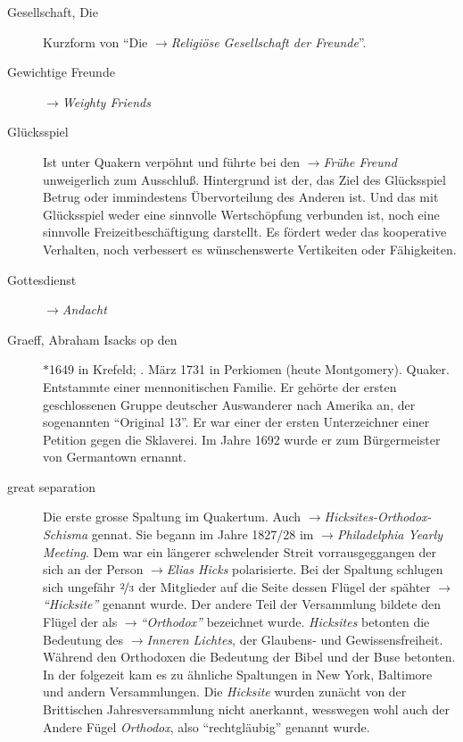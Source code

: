 \begin{description}
 \item[Gesellschaft, Die] Kurzform von "`Die
 $\to$\textit{Religiöse Gesellschaft der Freunde}"'.

\item[Gewichtige Freunde] $\to$\textit{Weighty Friends}

\item[Glücksspiel] Ist unter Quakern verpöhnt und führte bei den
$\to$\textit{Frühe Freund} unweigerlich zum Ausschluß. Hintergrund ist der,
das Ziel des Glücksspiel Betrug oder immindestens Übervorteilung des Anderen
ist. Und das mit Glücksspiel weder eine sinnvolle Wertschöpfung verbunden ist,
noch eine sinnvolle Freizeitbeschäftigung darstellt. Es fördert weder das
kooperative Verhalten, noch verbessert es wünschenswerte Vertikeiten oder
Fähigkeiten.

\item[Gottesdienst] $\to$\textit{Andacht}

 \item[Graeff, Abraham Isacks op den]  $\ast$1649 in Krefeld; . März 1731
 in Perkiomen (heute Montgomery). Quaker. Entstammte einer mennonitischen Familie.
Er gehörte der ersten geschlossenen Gruppe deutscher Auswanderer nach Amerika
an, der sogenannten "`Original 13"'. Er war einer der ersten Unterzeichner einer
Petition gegen die Sklaverei. Im Jahre 1692 wurde er zum Bürgermeister von
Germantown ernannt.

 \item[great separation] Die erste grosse Spaltung im Quakertum. Auch
 $\to$\textit{Hicksites-Orthodox-Schisma} gennat. Sie begann im
 Jahre 1827/28 im $\to$\textit{Philadelphia Yearly Meeting}. Dem war ein
 längerer schwelender Streit vorrausgeggangen der sich an der Person
 $\to$\textit{Elias Hicks} polarisierte. Bei der Spaltung schlugen sich
 ungefähr $\nicefrac{2}{3}$ der Mitglieder auf die Seite dessen Flügel der
 spähter $\to$\textit{"`Hicksite"'} genannt wurde. Der andere Teil der
 Versammlung bildete den Flügel der als $\to$\textit{"`Orthodox"'} bezeichnet
 wurde. \textit{Hicksites} betonten die Bedeutung des $\to$\textit{Inneren
 Lichtes}, der Glaubens- und Gewissensfreiheit. Während den Orthodoxen die
 Bedeutung der Bibel und der Buse betonten. In der folgezeit kam es zu
 ähnliche Spaltungen in New York, Baltimore und andern Versammlungen.
 Die \textit{Hicksite} wurden zunächt von der Brittischen Jahresversammlung
 nicht anerkannt, wesswegen wohl auch der Andere Fügel \textit{Orthodox},
 also "`rechtgläubig"' genannt wurde. 


\end{description}
